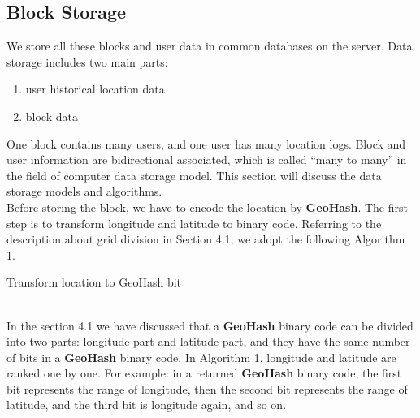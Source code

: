\documentclass[sigplan,screen]{acmart}
\begin{document}
\subsection{Block Storage}
We store all these blocks and user data in common databases on the server.
Data storage includes two main parts:
\begin{enumerate}
	\item user historical location data
	\item block data
\end{enumerate}
One block contains many users, and one user has many location logs.
Block and user information are bidirectional associated, which is called “many to many” in the field of computer data storage model.
This section will discuss the data storage models and algorithms.
\\
Before storing the block, we have to encode the location by \textbf{GeoHash}.
The first step is to transform longitude and latitude to binary code.
Referring to the description about grid division in Section 4.1, we adopt the following Algorithm 1.
\\
\begin{algorithm}[htb]
	\caption{Transform location to GeoHash bit}
	\begin{algorithmic}[1]
		\Else
		\EndIf
		\Else
		\EndIf
		\EndWhile
		\EndFunction
	\end{algorithmic}
\end{algorithm}
\\
In the section 4.1 we have discussed that a \textbf{GeoHash} binary code can be divided into two parts: longitude part and latitude part, and they have the same number of bits in a \textbf{GeoHash} binary code.
In Algorithm 1, longitude and latitude are ranked one by one.
For example: in a returned \textbf{GeoHash} binary code, the first bit represents the range of longitude, then the second bit represents the range of latitude, and the third bit is longitude again, and so on.
\end{document}
